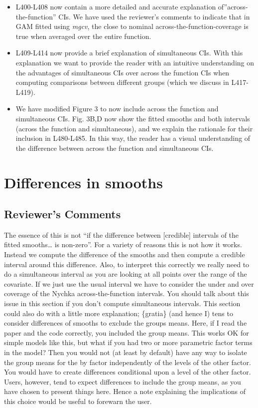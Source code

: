 \documentclass[
]{article}
\begin{document}
\begin{itemize}
\item
  L400-L408 now contain a more detailed and accurate explanation of''across-the-function'' CIs. We have used the reviewer's comments to indicate that in GAM fitted using \emph{mgcv}, the close to nominal across-the-function-coverage is true when averaged over the entire function.
\item
  L409-L414 now provide a brief explanation of simultaneous CIs. With this explanation we want to provide the reader with an intuitive understanding on the advantages of simultaneous CIs over across the function CIs when computing comparisons between different groups (which we discuss in L417-L419).
\item
  We have modified Figure 3 to now include across the function and simultaneous CIs. Fig. 3B,D now show the fitted smooths and both intervals (across the function and simultaneous), and we explain the rationale for their inclusion in L480-L485. In this way, the reader has a visual understanding of the difference between across the function and simultaneous CIs.
\end{itemize}

\hypertarget{differences-in-smooths}{%
\section{Differences in smooths}\label{differences-in-smooths}}

\hypertarget{reviewers-comments-8}{%
\subsection{Reviewer's Comments}\label{reviewers-comments-8}}

The essence of this is not ``if the difference between {[}credible{]} intervals of the fitted smooths\ldots{} is non-zero''. For a variety of reasons this is not how it works. Instead we compute the difference of the smooths and then compute a credible interval around this difference. Also, to interpret this correctly we really need to do a simultaneous interval as you are looking at all points over the range of the covariate. If we just use the usual interval we have to consider the under and over coverage of the Nychka across-the-function intervals. You should talk about this issue in this section if you don't compute simultaneous intervals.
This section could also do with a little more explanation; \{gratia\} (and hence I) tens to consider differences of smooths to exclude the groups means. Here, if I read the paper and the code correctly, you included the group means. This works OK for simple models like this, but what if you had two or more parametric factor terms in the model? Then you would not (at least by default) have any way to isolate the group means for the by factor independently of the levels of the other factor. You would have to create differences conditional upon a level of
the other factor. Users, however, tend to expect differences to include the group means, as you have chosen to present things here. Hence a note explaining the implications of this choice would be useful to forewarn the user.
\end{document}
